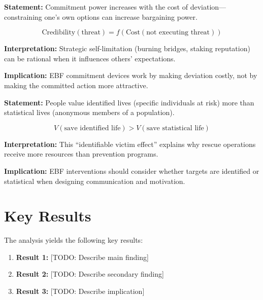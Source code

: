 \begin{tcolorbox}[colback=gray!5!white, colframe=gray!75!black,
    title=Axiom TS-5: Commitment Credibility]
\textbf{Statement:} Commitment power increases with the cost of deviation---
constraining one's own options can increase bargaining power.

\begin{equation}
\text{Credibility}(\text{threat}) = f(\text{Cost}(\text{not executing threat}))
\end{equation}

\textbf{Interpretation:} Strategic self-limitation (burning bridges, staking
reputation) can be rational when it influences others' expectations.

\textbf{Implication:} EBF commitment devices work by making deviation costly,
not by making the committed action more attractive.
\end{tcolorbox}

\begin{tcolorbox}[colback=gray!5!white, colframe=gray!75!black,
    title=Axiom TS-6: Statistical Lives vs. Identified Lives]
\textbf{Statement:} People value identified lives (specific individuals at risk)
more than statistical lives (anonymous members of a population).

\begin{equation}
V(\text{save identified life}) > V(\text{save statistical life})
\end{equation}

\textbf{Interpretation:} This ``identifiable victim effect'' explains why rescue
operations receive more resources than prevention programs.

\textbf{Implication:} EBF interventions should consider whether targets are
identified or statistical when designing communication and motivation.
\end{tcolorbox}



\section{Key Results}
\label{sec:results}

The analysis yields the following key results:

\begin{enumerate}
    \item \textbf{Result 1:} [TODO: Describe main finding]
    \item \textbf{Result 2:} [TODO: Describe secondary finding]
    \item \textbf{Result 3:} [TODO: Describe implication]
\end{enumerate}


